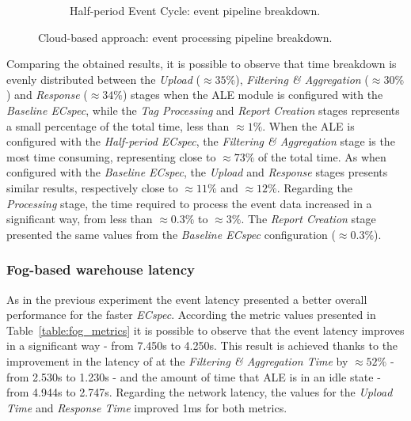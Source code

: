 \begin{figure}[ht!]
\begin{subfigure}{.5\textwidth}
    \caption{Half-period Event Cycle: event pipeline breakdown.}
    \label{fig:ecspecf_effective_half}
  \end{subfigure}
  \caption[Cloud-based approach: event processing breakdown.]{Cloud-based approach: event processing pipeline breakdown.}
  \label{fig:ecspecf_effective_breakdown}
\end{figure}

Comparing the obtained results, it is possible to observe that time breakdown is evenly distributed
between the \textit{Upload} ($\approx35\%$), \textit{Filtering \& Aggregation} ($\approx30\%$) and
\textit{Response} ($\approx34\%$) stages when the \gls{ALE} module is configured with the \textit{Baseline ECspec},
while the \textit{Tag Processing} and \textit{Report Creation} stages represents a small percentage of the
total time, less than $\approx1\%$. When the \gls{ALE} is configured with the \textit{Half-period ECspec},
the \textit{Filtering \& Aggregation} stage is the most time consuming, representing close to $\approx 73\%$
of the total time. As when configured with the \textit{Baseline ECspec}, the \textit{Upload} and
\textit{Response} stages presents similar results, respectively close to $\approx11\%$ and $\approx12\%$.
Regarding the \textit{Processing} stage, the time required to process the event data increased in a significant
way, from less than $\approx0.3\%$ to $\approx3\%$. The \textit{Report Creation} stage presented the same
values from the \textit{Baseline ECspec} configuration ($\approx0.3\%$).

\subsubsection{Fog-based warehouse latency}
\label{subs:eval_exp_latency_ecspec}
As in the previous experiment the event latency presented a better overall performance for the
faster \textit{ECspec}. According the metric values presented in Table~\ref{table:fog_metrics} it is
possible to observe that the event latency improves in a significant way - from 7.450s to 4.250s. This
result is achieved thanks to the improvement in the latency of at the \textit{Filtering \& Aggregation Time}
by $\approx52\%$ - from 2.530s to 1.230s - and the amount of time that \gls{ALE} is in an idle state -
from 4.944s to 2.747s. Regarding the network latency, the values for the \textit{Upload Time}
and \textit{Response Time} improved 1ms for both metrics.



